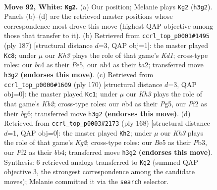 \documentclass[11pt]{article}
\begin{document}
\clearpage

\begin{figure}[p]\centering
\begin{subfigure}{0.46\textwidth}\centering
\resizebox{\linewidth}{!}{%
\newchessgame
\chessboard[
  setfen={8/7k/8/4B3/1nb5/7K/5P2/8 w - - 29 92},
  showmover=false,
  pgfstyle=straightmove, color=movearrow, markmove={h3-g2}
]}
\caption{}
\end{subfigure}\hfill
\begin{subfigure}{0.46\textwidth}\centering
\resizebox{\linewidth}{!}{%
\newchessgame
\chessboard[
  setfen={3k4/8/8/4p3/8/4bP2/B7/3K4 b - - 10 94},
  showmover=false,
  pgfstyle=straightmove, color=movearrow, markmove={d8-c8}
]}
\caption{}
\end{subfigure}
\\[4pt]
\begin{subfigure}{0.46\textwidth}\centering
\resizebox{\linewidth}{!}{%
\newchessgame
\chessboard[
  setfen={5B2/3k4/6b1/6P1/8/8/1K6/8 w - - 3 86},
  showmover=false,
  pgfstyle=straightmove, color=movearrow, markmove={b2-c1}
]}
\caption{}
\end{subfigure}\hfill
\begin{subfigure}{0.46\textwidth}\centering
\resizebox{\linewidth}{!}{%
\newchessgame
\chessboard[
  setfen={4B3/8/8/6n1/1b1k4/1P6/6K1/8 w - - 14 85},
  showmover=false,
  pgfstyle=straightmove, color=movearrow, markmove={g2-h2}
]}
\caption{}
\end{subfigure}
\caption{\textbf{Move 92, White: \texttt{Kg2}.} (a) Our position; Melanie plays \texttt{Kg2} (\texttt{h3g2}). Panels (b)--(d) are the retrieved master positions whose correspondence most drove this move (highest QAP objective among those that transfer to it). (b) Retrieved from \texttt{ccrl\_top\_p0001\#1495} (ply 187) [structural distance $d$=3, QAP obj=1]: the master played \texttt{Kc8}; under $\mu$ our \emph{Kh3} plays the role of that game's \emph{Kd1}; cross-type roles: our \emph{b}c4 as their \emph{P}e5, our \emph{n}b4 as their \emph{b}a2; transferred move \texttt{h3g2} \textbf{(endorses this move)}. (c) Retrieved from \texttt{ccrl\_top\_p0000\#1609} (ply 170) [structural distance $d$=3, QAP obj=0]: the master played \texttt{Kc1}; under $\mu$ our \emph{Kh3} plays the role of that game's \emph{Kb2}; cross-type roles: our \emph{n}b4 as their \emph{P}g5, our \emph{P}f2 as their \emph{b}g6; transferred move \texttt{h3g2} \textbf{(endorses this move)}. (d) Retrieved from \texttt{ccrl\_top\_p0003\#2173} (ply 168) [structural distance $d$=1, QAP obj=0]: the master played \texttt{Kh2}; under $\mu$ our \emph{Kh3} plays the role of that game's \emph{Kg2}; cross-type roles: our \emph{B}e5 as their \emph{P}b3, our \emph{P}f2 as their \emph{b}b4; transferred move \texttt{h3g2} \textbf{(endorses this move)}. Synthesis: 6 retrieved analogs transferred to \texttt{Kg2} (summed QAP objective 3, the strongest correspondence among the candidate moves); Melanie committed it via the \texttt{search} selector.}
\label{fig:thought-m182}
\end{figure}
\end{document}
